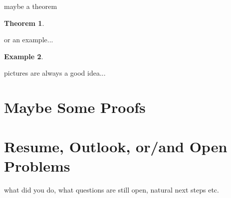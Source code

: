 \documentclass[12pt]{amsart}
\numberwithin{equation}{section}
\newtheorem{thm}{Theorem}
\theoremstyle{definition}
\newtheorem{example}[thm]{Example}
\numberwithin{thm}{section}
\begin{document}
maybe a theorem


\begin{thm}

\end{thm}

or an example...
\begin{example}

\end{example}

pictures are always a good idea...



\newpage
\section{Maybe Some Proofs}


\newpage
\section{Resume, Outlook, or/and Open Problems}
\label{Sec:Outlook}


what did you do, what questions are still open, natural next steps etc. 



\newpage


\end{document}
